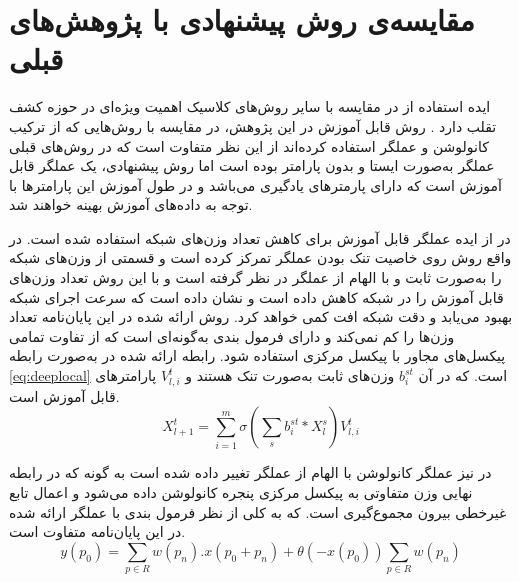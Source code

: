 \section{مقایسه‌ی روش پیشنهادی با پژوهش‌های قبلی}
ایده استفاده از 
در مقایسه با سایر روش‌های کلاسیک اهمیت ویژه‌ای در حوزه کشف تقلب دارد
\cite{maatta2011face,chingovska2012effectiveness,freitas2012lbp,rehman2020enhancing,li2019face,yu2020searching,zhang2020face}.
روش  قابل آموزش در این پژوهش، در مقایسه با روش‌هایی که از ترکیب کانولوشن و عملگر  استفاده کرده‌اند
\cite{li2019face,rehman2020enhancing}
از این نظر متفاوت است که در روش‌های قبلی عملگر  به‌صورت ایستا و بدون پارامتر بوده است اما روش پیشنهادی، یک عملگر قابل آموزش است که دارای پارمترهای یادگیری می‌باشد و در طول آموزش این پارامترها با توجه به داده‌های آموزش بهینه خواهند شد.

در
\cite{juefei2017local} 
از ایده عملگر  قابل آموزش برای کاهش تعداد وزن‌های شبکه استفاده شده است. در واقع روش
\cite{juefei2017local} 
روی خاصیت تنک بودن
 عملگر  تمرکز کرده است و قسمتی از وزن‌های شبکه را به‌صورت ثابت و با الهام از عملگر  در نظر گرفته است و با این روش تعداد وزن‌های قابل آموزش را در شبکه کاهش داده است و نشان داده است که سرعت اجرای شبکه بهبود می‌یابد و دقت شبکه افت کمی خواهد کرد. روش ارائه شده در این پایان‌نامه تعداد وزن‌ها را کم نمی‌کند و دارای فرمول بندی به‌گونه‌ای است که از تفاوت تمامی پیکسل‌های مجاور با پیکسل مرکزی استفاده شود.
رابطه ارائه شده در 
\cite{juefei2017local} 
 به‌صورت رابطه
\ref{eq:deeplocal}
  است. که در آن 
  $b_i^{st}$
  وزن‌های ثابت به‌صورت تنک هستند و 
  $V_{l,i}^t$
  پارامترهای قابل آموزش است.
\begin{equation}\label{eq:deeplocal}
	X_{l+1}^t=\sum_{i=1}^{m}{\sigma(\sum_{s}{b_i^{st}*X_l^s })V_{l,i}^t}
\end{equation}

در 
\cite{yu2020searching}
نیز عملگر کانولوشن با الهام از عملگر  تغییر داده شده است به گونه که در رابطه نهایی وزن متفاوتی به پیکسل مرکزی پنجره کانولوشن داده می‌شود و اعمال تابع غیرخطی بیرون مجموع‌گیری است. که به کلی از نظر فرمول بندی با عملگر ارائه شده در این پایان‌نامه متفاوت است. 
\begin{equation}\label{eq:central-dif4}
	y(p_0) = \sum_{p \in R} {w(p_n).x(p_0+p_n)} +
	\theta(-x(p_0))\sum_{p \in R}{w(p_n)}
\end{equation}




 

  




